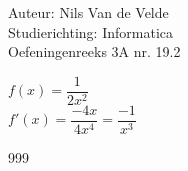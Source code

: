\documentclass[a4paper]{article}
\begin{document}
  
\noindent \large Auteur: Nils Van de Velde \\
\noindent \large Studierichting: Informatica\\
\noindent \large Oefeningenreeks 3A nr. 19.2\\

\medskip

\normalsize

$f(x) = \dfrac{1}{2x^2}$\\

$f'(x) = \dfrac{-4x}{4x^4} = \dfrac{-1}{x^3}$\\

\begin{thebibliography}{999}
\end{thebibliography}
\end{document}
